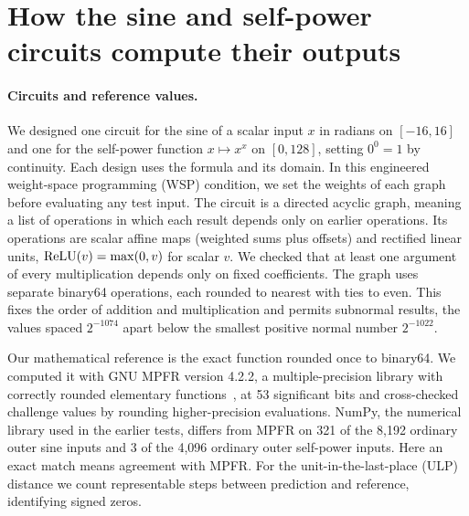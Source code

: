 \section{How the sine and self-power circuits compute their outputs}
\label{app:smooth-circuits}

\paragraph{Circuits and reference values.}
We designed one circuit for the sine of a scalar input $x$ in radians on $[-16,16]$ and one for the self-power function $x\mapsto x^x$ on $[0,128]$, setting $0^0=1$ by continuity. Each design uses the formula and its domain. In this engineered weight-space programming (WSP) condition, we set the weights of each graph before evaluating any test input. The circuit is a directed acyclic graph, meaning a list of operations in which each result depends only on earlier operations. Its operations are scalar affine maps (weighted sums plus offsets) and rectified linear units, $\operatorname{ReLU}(v)=\max(0,v)$ for scalar $v$. We checked that at least one argument of every multiplication depends only on fixed coefficients. The graph uses separate binary64 operations, each rounded to nearest with ties to even. This fixes the order of addition and multiplication and permits subnormal results, the values spaced $2^{-1074}$ apart below the smallest positive normal number $2^{-1022}$.

Our mathematical reference is the exact function rounded once to binary64. We computed it with GNU MPFR version 4.2.2, a multiple-precision library with correctly rounded elementary functions~\cite{mpfr}, at 53 significant bits and cross-checked challenge values by rounding higher-precision evaluations. NumPy, the numerical library used in the earlier tests, differs from MPFR on 321 of the 8,192 ordinary outer sine inputs and 3 of the 4,096 ordinary outer self-power inputs. Here an exact match means agreement with MPFR. For the unit-in-the-last-place (ULP) distance we count representable steps between prediction and reference, identifying signed zeros.

